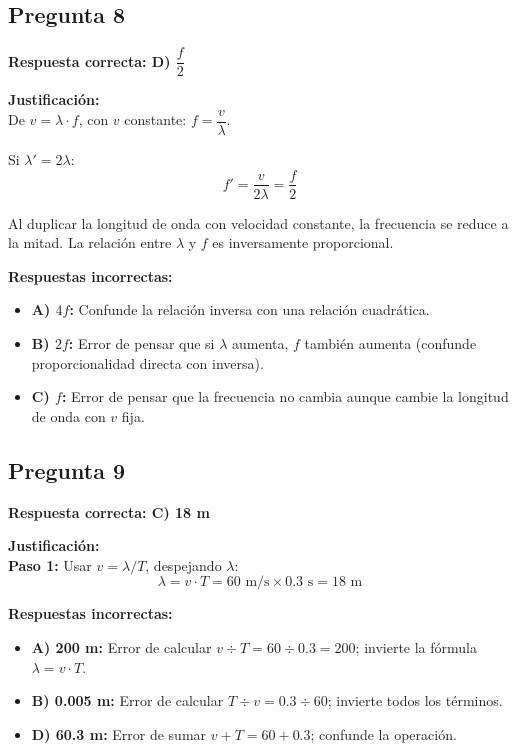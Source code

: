 \begin{respuestabox}
\subsection*{Pregunta 8}
\textcolor{verdecorrecto}{\textbf{Respuesta correcta: D) $\dfrac{f}{2}$}}

\textbf{Justificación:}\\
De $v = \lambda \cdot f$, con $v$ constante: $f = \dfrac{v}{\lambda}$.

Si $\lambda' = 2\lambda$:
$$f' = \frac{v}{2\lambda} = \frac{f}{2}$$

Al duplicar la longitud de onda con velocidad constante, la frecuencia se reduce a la mitad. La relación entre $\lambda$ y $f$ es inversamente proporcional.

\textbf{Respuestas incorrectas:}
\begin{itemize}
    \item \textbf{A) $4f$:} Confunde la relación inversa con una relación cuadrática.
    \item \textbf{B) $2f$:} Error de pensar que si $\lambda$ aumenta, $f$ también aumenta (confunde proporcionalidad directa con inversa).
    \item \textbf{C) $f$:} Error de pensar que la frecuencia no cambia aunque cambie la longitud de onda con $v$ fija.
\end{itemize}
\end{respuestabox}

\begin{respuestabox}
\subsection*{Pregunta 9}
\textcolor{verdecorrecto}{\textbf{Respuesta correcta: C) 18 m}}

\textbf{Justificación:}\\
\textbf{Paso 1:} Usar $v = \lambda / T$, despejando $\lambda$:
$$\lambda = v \cdot T = 60 \text{ m/s} \times 0.3 \text{ s} = 18 \text{ m}$$

\textbf{Respuestas incorrectas:}
\begin{itemize}
    \item \textbf{A) 200 m:} Error de calcular $v \div T = 60 \div 0.3 = 200$; invierte la fórmula $\lambda = v \cdot T$.
    \item \textbf{B) 0.005 m:} Error de calcular $T \div v = 0.3 \div 60$; invierte todos los términos.
    \item \textbf{D) 60.3 m:} Error de sumar $v + T = 60 + 0.3$; confunde la operación.
\end{itemize}
\end{respuestabox}

